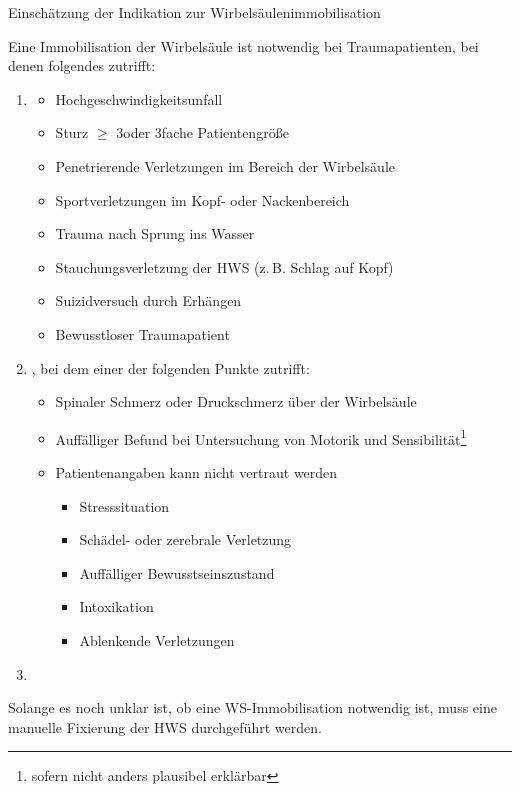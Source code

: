 \documentclass[
ngerman,
paper=a4,
asymmetric,
fontsize=10pt,
headings=small,
draft=false,
numbers=noenddot,
bibtotocnumbered,
footnotes=multiple,
]{scrreprt}
\begin{document}
{Einschätzung der Indikation zur Wirbelsäulenimmobilisation}
{\label{m:einschaetzung-indikation-ws-immobilisation}}
{%
Eine Immobilisation der Wirbelsäule ist notwendig bei
Traumapatienten, bei denen folgendes zutrifft:

\begin{enumerate}
  \item {}
  \begin{itemize}
    \item Hochgeschwindigkeitsunfall
    \item Sturz $\geq$ 3\Meter* oder 3fache Patientengröße
    \item Penetrierende Verletzungen im Bereich der
    Wirbelsäule
    \item Sportverletzungen im Kopf- oder Nackenbereich
    \item Trauma nach Sprung ins Wasser
    \item Stauchungsverletzung der HWS (z.\,B. Schlag auf
    Kopf)
    \item Suizidversuch durch Erhängen
    \item Bewusstloser Traumapatient
  \end{itemize}
  \item {}, bei dem einer der
  folgenden Punkte zutrifft:
  \begin{itemize}
    \item Spinaler Schmerz oder Druckschmerz über der
    Wirbelsäule
    \item Auffälliger Befund bei Untersuchung von Motorik
    und Sensibilität\footnote{sofern nicht anders plausibel
    erklärbar}
    \item Patientenangaben kann nicht vertraut
    werden
    \begin{itemize}
      \item Stresssituation
      \item Schädel- oder zerebrale Verletzung
      \item Auffälliger Bewusstseinszustand
      \item Intoxikation
      \item Ablenkende Verletzungen
    \end{itemize}
  \end{itemize}
  \item {}
\end{enumerate}

Solange es noch unklar ist, ob eine WS-Immobilisation
notwendig ist, muss eine manuelle Fixierung der HWS
durchgeführt werden.

\cite{ITLSde6,ScholzNotfallmedizin2,SiewertChirurgie8}
}
\end{document}
